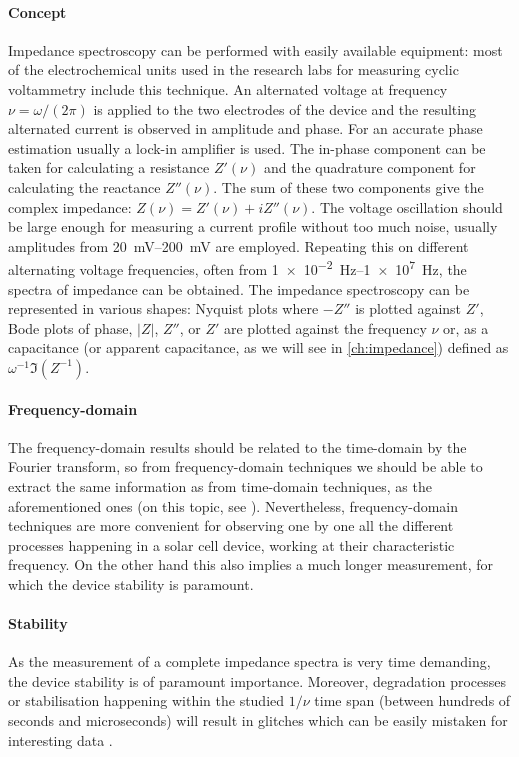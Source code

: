 	\paragraph{Concept}
	Impedance spectroscopy can be performed with easily available equipment: most of the electrochemical units used in the research labs for measuring cyclic voltammetry include this technique.
	An alternated voltage at frequency $\nu = \omega / (2 \pi)$ is applied to the two electrodes of the device and the resulting alternated current is observed in amplitude and phase.
	For an accurate phase estimation usually a lock-in amplifier is used.
	The in-phase component can be taken for calculating a resistance $Z'(\nu)$ and the quadrature component for calculating the reactance $Z''(\nu)$.
	The sum of these two components give the complex impedance: $Z(\nu) = Z'(\nu) + iZ''(\nu)$.
	The voltage oscillation should be large enough for measuring a current profile without too much noise, usually amplitudes from \SIrange{20}{200}{\mV} are employed.
	Repeating this on different alternating voltage frequencies, often from \SIrange{1e-2}{1e7}{\Hz}, the spectra of impedance can be obtained.
	The impedance spectroscopy can be represented in various shapes: Nyquist plots where $-Z''$ is plotted against $Z'$, Bode plots of phase, $|Z|$, $Z''$, or $Z'$ are plotted against the frequency $\nu$ or, as a capacitance (or apparent capacitance, as we will see in \cref{ch:impedance}) defined as $\omega^{-1}\Im(Z^{-1})$.

	\paragraph{Frequency\hyp{}domain}
	The frequency\hyp{}domain results should be related to the time\hyp{}domain by the Fourier transform, so from frequency\hyp{}domain techniques we should be able to extract the same information as from time\hyp{}domain techniques, as the aforementioned ones (on this topic, see ).
	Nevertheless, frequency\hyp{}domain techniques are more convenient for observing one by one all the different processes happening in a solar cell device, working at their characteristic frequency.
	On the other hand this also implies a much longer measurement, for which the device stability is paramount.

	\paragraph{Stability}
	As the measurement of a complete impedance spectra is very time demanding, the device stability is of paramount importance.
	Moreover, degradation processes or stabilisation happening within the studied $1/\nu$ time span (between hundreds of seconds and microseconds) will result in glitches which can be easily mistaken for interesting data \cite{Jacobs2018,Moia2019}.

